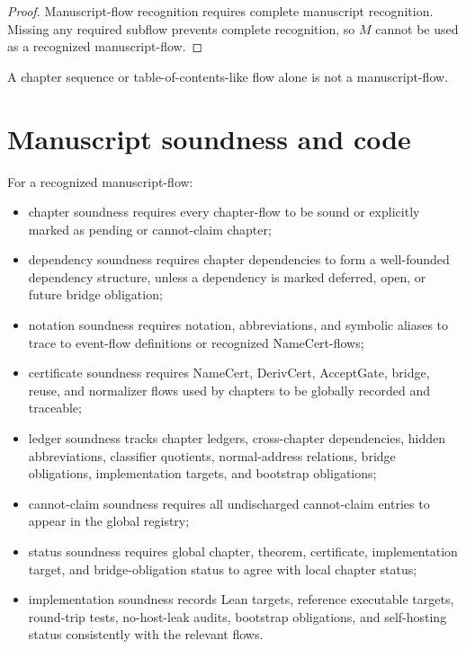 \begin{proof}
Manuscript-flow recognition requires complete manuscript recognition. Missing any required subflow prevents complete recognition, so $M$ cannot be used as a recognized manuscript-flow.
\end{proof}

\begin{corollary}
\label{cor:chapter-manuscript-toc-not-manuscript}
A chapter sequence or table-of-contents-like flow alone is not a manuscript-flow.
\end{corollary}

\section{Manuscript soundness and code}
\label{sec:chapter-manuscript-manuscript-soundness-code}

\begin{definition}
\label{def:chapter-manuscript-manuscript-soundness-clauses}
For a recognized manuscript-flow:
\begin{itemize}
\item chapter soundness requires every chapter-flow to be sound or explicitly marked as pending or cannot-claim chapter;
\item dependency soundness requires chapter dependencies to form a well-founded dependency structure, unless a dependency is marked deferred, open, or future bridge obligation;
\item notation soundness requires notation, abbreviations, and symbolic aliases to trace to event-flow definitions or recognized NameCert-flows;
\item certificate soundness requires NameCert, DerivCert, AcceptGate, bridge, reuse, and normalizer flows used by chapters to be globally recorded and traceable;
\item ledger soundness tracks chapter ledgers, cross-chapter dependencies, hidden abbreviations, classifier quotients, normal-address relations, bridge obligations, implementation targets, and bootstrap obligations;
\item cannot-claim soundness requires all undischarged cannot-claim entries to appear in the global registry;
\item status soundness requires global chapter, theorem, certificate, implementation target, and bridge-obligation status to agree with local chapter status;
\item implementation soundness records Lean targets, reference executable targets, round-trip tests, no-host-leak audits, bootstrap obligations, and self-hosting status consistently with the relevant flows.
\end{itemize}
\end{definition}

